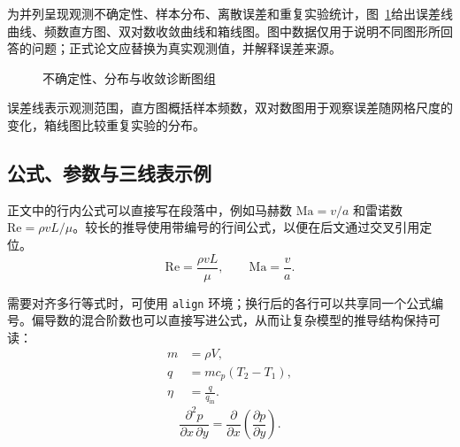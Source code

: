 为并列呈现观测不确定性、样本分布、离散误差和重复实验统计，图~\ref{fig:ch2-diagnostics}给出误差线曲线、频数直方图、双对数收敛曲线和箱线图。图中数据仅用于说明不同图形所回答的问题；正式论文应替换为真实观测值，并解释误差来源。
\begin{figure}[htbp]
  \centering
  
  \caption{不确定性、分布与收敛诊断图组}
  \label{fig:ch2-diagnostics}
\end{figure}

误差线表示观测范围，直方图概括样本频数，双对数图用于观察误差随网格尺度的变化，箱线图比较重复实验的分布。

\subsection{公式、参数与三线表示例}

正文中的行内公式可以直接写在段落中，例如马赫数 $\mathrm{Ma}=v/a$ 和雷诺数 $\mathrm{Re}=\rho vL/\mu$。较长的推导使用带编号的行间公式，以便在后文通过交叉引用定位。
\begin{equation}
  \mathrm{Re}=\frac{\rho vL}{\mu},\qquad \mathrm{Ma}=\frac{v}{a}.
  \label{eq:dimensionless-numbers}
\end{equation}

需要对齐多行等式时，可使用 \texttt{align} 环境；换行后的各行可以共享同一个公式编号。偏导数的混合阶数也可以直接写进公式，从而让复杂模型的推导结构保持可读：
\begin{equation}
  \begin{aligned}
    m &= \rho V,\\
    q &= mc_p(T_2-T_1),\\
    \eta &= \frac{q}{q_{\mathrm{in}}}.
  \end{aligned}
  \label{eq:aligned-example}
\end{equation}
\begin{equation}
  \frac{\partial^2p}{\partial x\,\partial y}
  =\frac{\partial}{\partial x}\left(\frac{\partial p}{\partial y}\right).
  \label{eq:mixed-derivative}
\end{equation}

